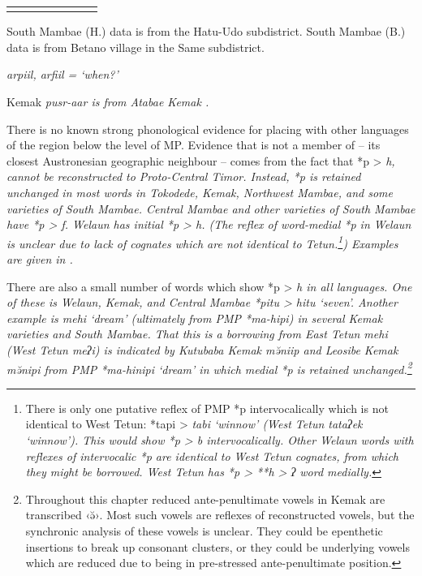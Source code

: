 \begin{table}
\begin{threeparttable}
\begin{tabular}{ll@{ }llllll}
		\lspbottomrule
	\end{tabular}
		\begin{tablenotes}\tnsize
			\item[†]	{South Mambae (H.) data is from the Hatu-Udo subdistrict.
								South Mambae (B.) data is from Betano village in the Same subdistrict.}
			\item[‡]	{ \it{arpiil, arfiil} = ‘when?’}
			\item[Δ]	{Kemak \it{pusr-aar} is from Atabae Kemak \citep{Elliot2020}.}
		\end{tablenotes}
	\end{threeparttable}
\end{table}

There is no known strong phonological evidence for placing  with other languages of the region below the level of MP.
Evidence that  is not a member of  -- its
closest Austronesian geographic neighbour -- comes from
the fact that *p > \it{h,} {\0} cannot be reconstructed to Proto-Central Timor.
Instead, *p is retained unchanged in most words in Tokodede,
Kemak, Northwest Mambae, and some varieties of South Mambae.
Central Mambae and other varieties of South Mambae have *p > \it{f}.
Welaun has initial *p > \it{h}.
(The reflex of word-medial *p in Welaun is unclear due to lack
of cognates which are not identical to Tetun.\footnote{
		There is only one putative reflex of PMP *p intervocalically which
		is not identical to West Tetun: *tapi > \it{tabi} ‘winnow’
		(West Tetun \it{tataʔek} ‘winnow’).
		This would show *p > \it{b} intervocalically.
		Other Welaun words with reflexes of intervocalic *p are identical
		to West Tetun cognates, from which they might be borrowed.
		West Tetun has *p > **h > \it{ʔ} word medially.})
Examples are given in .

There are also a small number of words which show *p > \it{h}
in all  languages.
One of these is Welaun,
Kemak, and Central Mambae *pitu > \it{hitu} ‘seven’.
Another example is \it{mehi} ‘dream’
(ultimately from PMP *ma-hipi)
in several Kemak varieties and South Mambae.
That this is a borrowing from East Tetun \it{mehi} (West Tetun
\it{meʔi}) is indicated by Kutubaba Kemak \it{mə̆niip}
and Leosibe Kemak \it{mə̆nipi} from PMP *ma-h\<in\>ipi ‘dream’
in which medial *p is retained unchanged.\footnote{
		Throughout this chapter reduced ante-penultimate vowels in Kemak are transcribed ‹ə̆›.
		Most such vowels are reflexes of reconstructed vowels,
		but the synchronic analysis of these vowels is unclear.
		They could be epenthetic insertions to break up consonant clusters,
		or they could be underlying vowels which are reduced due to being
		in pre-stressed ante-penultimate position.}






